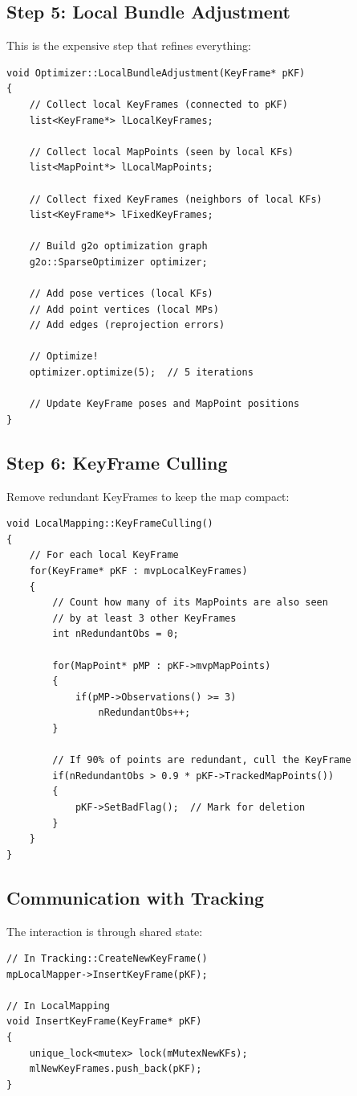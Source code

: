 \subsection{Step 5: Local Bundle Adjustment}

This is the expensive step that refines everything:

\begin{lstlisting}[caption={Local BA concept}]
void Optimizer::LocalBundleAdjustment(KeyFrame* pKF)
{
    // Collect local KeyFrames (connected to pKF)
    list<KeyFrame*> lLocalKeyFrames;
    
    // Collect local MapPoints (seen by local KFs)
    list<MapPoint*> lLocalMapPoints;
    
    // Collect fixed KeyFrames (neighbors of local KFs)
    list<KeyFrame*> lFixedKeyFrames;
    
    // Build g2o optimization graph
    g2o::SparseOptimizer optimizer;
    
    // Add pose vertices (local KFs)
    // Add point vertices (local MPs)
    // Add edges (reprojection errors)
    
    // Optimize!
    optimizer.optimize(5);  // 5 iterations
    
    // Update KeyFrame poses and MapPoint positions
}
\end{lstlisting}

\subsection{Step 6: KeyFrame Culling}

Remove redundant KeyFrames to keep the map compact:

\begin{lstlisting}[caption={KeyFrameCulling concept}]
void LocalMapping::KeyFrameCulling()
{
    // For each local KeyFrame
    for(KeyFrame* pKF : mvpLocalKeyFrames)
    {
        // Count how many of its MapPoints are also seen
        // by at least 3 other KeyFrames
        int nRedundantObs = 0;
        
        for(MapPoint* pMP : pKF->mvpMapPoints)
        {
            if(pMP->Observations() >= 3)
                nRedundantObs++;
        }
        
        // If 90% of points are redundant, cull the KeyFrame
        if(nRedundantObs > 0.9 * pKF->TrackedMapPoints())
        {
            pKF->SetBadFlag();  // Mark for deletion
        }
    }
}
\end{lstlisting}

\subsection{Communication with Tracking}

The interaction is through shared state:

\begin{lstlisting}[caption={Tracking to LocalMapping communication}]
// In Tracking::CreateNewKeyFrame()
mpLocalMapper->InsertKeyFrame(pKF);

// In LocalMapping
void InsertKeyFrame(KeyFrame* pKF)
{
    unique_lock<mutex> lock(mMutexNewKFs);
    mlNewKeyFrames.push_back(pKF);
}
\end{lstlisting}
